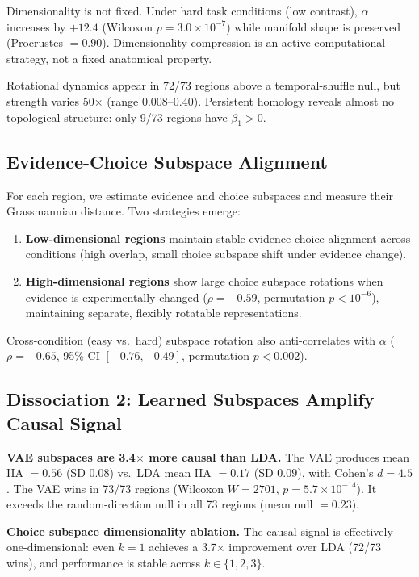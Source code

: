 \documentclass{article}
\begin{document}
Dimensionality is not fixed. Under hard task conditions (low contrast), $\alpha$ increases by $+12.4$ (Wilcoxon $p = 3.0 \times 10^{-7}$) while manifold shape is preserved (Procrustes $= 0.90$). Dimensionality compression is an active computational strategy, not a fixed anatomical property.

Rotational dynamics appear in 72/73 regions above a temporal-shuffle null, but strength varies 50$\times$ (range $0.008$--$0.40$). Persistent homology reveals almost no topological structure: only 9/73 regions have $\beta_1 > 0$.

\subsection{Evidence-Choice Subspace Alignment}

For each region, we estimate evidence and choice subspaces and measure their Grassmannian distance. Two strategies emerge:

\begin{enumerate}
\item \textbf{Low-dimensional regions} maintain stable evidence-choice alignment across conditions (high overlap, small choice subspace shift under evidence change).
\item \textbf{High-dimensional regions} show large choice subspace rotations when evidence is experimentally changed ($\rho = -0.59$, permutation $p < 10^{-6}$), maintaining separate, flexibly rotatable representations.
\end{enumerate}

Cross-condition (easy vs.\ hard) subspace rotation also anti-correlates with $\alpha$ ($\rho = -0.65$, 95\% CI $[-0.76, -0.49]$, permutation $p < 0.002$).

\subsection{Dissociation 2: Learned Subspaces Amplify Causal Signal}

\textbf{VAE subspaces are 3.4$\times$ more causal than LDA.} The VAE produces mean IIA $= 0.56$ (SD $0.08$) vs.\ LDA mean IIA $= 0.17$ (SD $0.09$), with Cohen's $d = 4.5$. The VAE wins in 73/73 regions (Wilcoxon $W = 2701$, $p = 5.7 \times 10^{-14}$). It exceeds the random-direction null in all 73 regions (mean null $= 0.23$).

\textbf{Choice subspace dimensionality ablation.} The causal signal is effectively one-dimensional: even $k = 1$ achieves a 3.7$\times$ improvement over LDA (72/73 wins), and performance is stable across $k \in \{1, 2, 3\}$.
\end{document}
